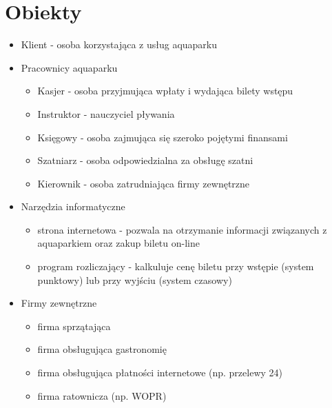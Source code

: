 \documentclass[a4paper,11pt]{article}
\begin{document}
\section{Obiekty}
\begin{itemize}
    \item Klient - osoba korzystająca z usług aquaparku
    \item Pracownicy aquaparku
            \begin{itemize}
                \item Kasjer - osoba przyjmująca wpłaty i wydająca bilety wstępu
                \item Instruktor - nauczyciel pływania
                \item Księgowy - osoba zajmująca się szeroko pojętymi finansami
                \item Szatniarz - osoba odpowiedzialna za obsługę szatni
                \item Kierownik - osoba zatrudniająca firmy zewnętrzne
            \end{itemize}
    \item Narzędzia informatyczne
            \begin{itemize}
                \item strona internetowa - pozwala na otrzymanie informacji związanych z aquaparkiem oraz zakup biletu on-line
                \item program rozliczający - kalkuluje cenę biletu przy wstępie (system punktowy) lub przy wyjściu (system czasowy)
            \end{itemize}
    \item Firmy zewnętrzne
            \begin{itemize}
                \item firma sprzątająca
                \item firma obsługująca gastronomię
                \item firma obsługująca płatności internetowe (np. przelewy 24)
                \item firma ratownicza (np. WOPR)
            \end{itemize}
\end{itemize}
\end{document}
